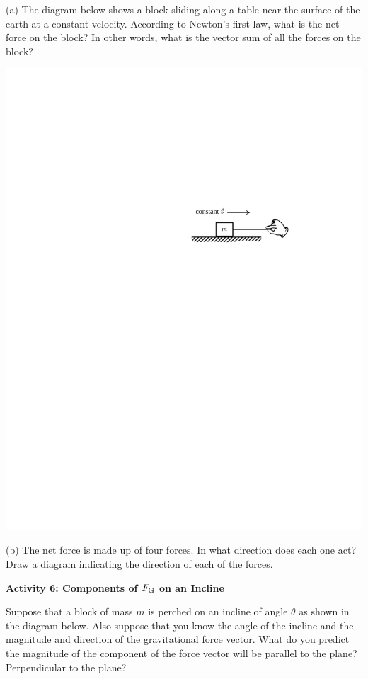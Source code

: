 
(a) The diagram below shows a block sliding along a table near the surface of
the earth at a constant velocity. According to Newton's first law, what is the
net force on the block? In other words, what is the vector sum of all the forces on the block?

\vspace{0.3cm}
\hspace{0.5in}\includegraphics{newton/newton_fig9_new.pdf}
\vspace{0.3cm}

(b) The net force is made up of four forces.  
In what direction does each one act? Draw a
diagram indicating the direction of each of the forces.
\answerspace{20mm}

\pagebreak[2]
\textbf{Activity 6: Components of $F_{\rm G}$ on an Incline }

Suppose that a block of mass $m$ is perched on an incline of angle \( \theta  \)
as shown in the diagram below. Also suppose that you know the angle of the incline
and the magnitude and direction of the gravitational force vector. What do you
predict the magnitude of the component of the force vector will be parallel
to the plane? Perpendicular to the plane?


